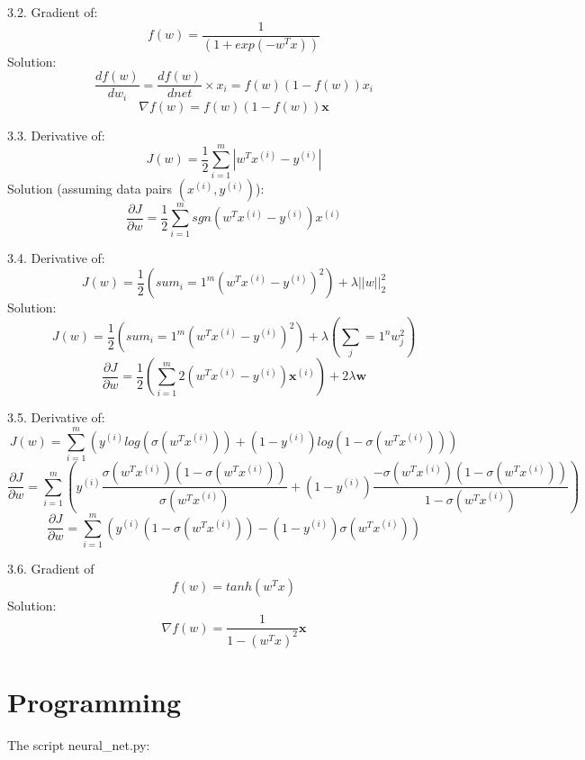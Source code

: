 \documentclass[10pt]{article}
\begin{document}
3.2. Gradient of:
\[
	f(w)=\frac{1}{(1+exp(-w^T x))}
\]
Solution:
\[
	\frac{d f(w)}{d w_i}=
	\frac{d f(w)}{d net}\times x_i=
	f(w)(1-f(w))x_i
\]
\[
	\nabla f(w)=f(w)(1-f(w))\textbf{x}
\]

3.3. Derivative of:
\[
	J(w)=\frac{1}{2}\sum_{i=1}^m\left|w^T x^{(i)}-y^{(i)}\right|
\]
Solution (assuming data pairs $(x^{(i)}, y^{(i)})$):
\[
	\frac{\partial J}{\partial w}=
	\frac{1}{2}\sum_{i=1}^m sgn\left(w^T x^{(i)}-y^{(i)}\right)x^{(i)}
\]

3.4. Derivative of:
\[
	J(w)=\frac{1}{2}\left(sum_i=1^m\left(w^T x^{(i)}-y^{(i)}\right)^2\right)+\lambda\left||w\right||_2^2
\]
Solution:
\[
	J(w)=\frac{1}{2}\left(sum_i=1^m\left(w^T x^{(i)}-y^{(i)}\right)^2\right)
	+\lambda\left(\sum_j=1^n w_j^2\right)
\]
\[
	\frac{\partial J}{\partial w}=
	\frac{1}{2}\left(\sum_{i=1}^m 2\left(w^T x^{(i)}-y^{(i)}\right)\textbf{x}^{(i)}\right)
	+2\lambda \textbf{w}
\]

3.5. Derivative of:
\[
	J(w)=\sum_{i=1}^m\left(
		y^{(i)}log(\sigma(w^T x^{(i)}))+(1-y^{(i)})log(1-\sigma(w^T x^{(i)}))
	\right)
\]
\[
	\frac{\partial J}{\partial w}=\sum_{i=1}^m\left(
		y^{(i)}\frac
			{\sigma(w^T x^{(i)})(1-\sigma(w^T x^{(i)}))}
			{\sigma(w^T x^{(i)})}
		+(1-y^{(i)})\frac
			{-\sigma(w^T x^{(i)})(1-\sigma(w^T x^{(i)}))}
			{1-\sigma(w^T x^{(i)})}
	\right)
\]
\[
	\frac{\partial J}{\partial w}=\sum_{i=1}^m\left(
		y^{(i)}(1-\sigma(w^T x^{(i)}))-(1-y^{(i)})\sigma(w^T x^{(i)})
	\right)
\]

3.6. Gradient of
\[
	f(w) = tanh(w^T x)
\]
Solution:
\[
	\nabla f(w)=\frac{1}{1-(w^T x)^2}\textbf{x}
\]


\newpage
\section{Programming}
The script neural\_net.py:
\end{document}
